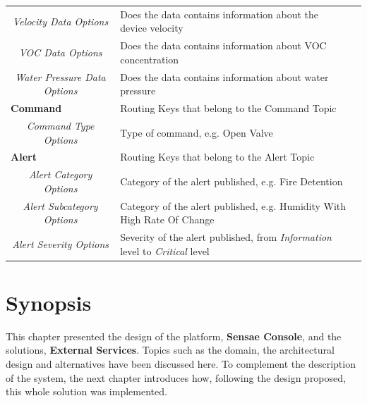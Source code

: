 \begin{landscape}
\begin{longtable}{cll}
   \textit{Velocity Data Options}          & Does the data contains information about the device velocity\footnotemark[1]\footnotemark[2]              &  \\
   \textit{VOC Data Options}               & Does the data contains information about VOC concentration\footnotemark[1]\footnotemark[2]                &  \\
   \textit{Water Pressure Data Options}    & Does the data contains information about water pressure\footnotemark[1]\footnotemark[2]                   &  \\ \cline{1-2}
   \multicolumn{1}{l}{\textbf{Command}}    & Routing Keys that belong to the Command Topic                                                             &  \\
   \textit{Command Type Options}           & Type of command, e.g. Open Valve                                                                          &  \\ \cline{1-2}
   \multicolumn{1}{l}{\textbf{Alert}}      & Routing Keys that belong to the Alert Topic                                                               &  \\
   \textit{Alert Category Options}         & Category of the alert published, e.g. Fire Detention                                                      &  \\
   \textit{Alert Subcategory Options}      & Category of the alert published, e.g. Humidity With High Rate Of Change                                   &  \\
   \textit{Alert Severity Options}         & Severity of the alert published, from \textit{Information} level to \textit{Critical} level               &  \\ \cline{1-2}
   \end{longtable}
\end{landscape}

\section{Synopsis}
\label{sec:design:synopsis}

This chapter presented the design of the platform, \textbf{Sensae Console}, and the solutions, \textbf{External Services}. Topics such as the domain, the architectural design and alternatives have been discussed here. To complement the description of the system, the next chapter introduces how, following the design proposed, this whole solution was implemented.
